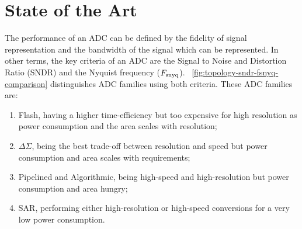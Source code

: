 
\chapter{State of the Art}
\label{sec:soa}
\ifpdf
    \graphicspath{{Chapter2/Figs/Raster/}{Chapter2/Figs/PDF/}{Chapter2/Figs/}}
\else
    \graphicspath{{Chapter2/Figs/Vector/}{Chapter2/Figs/}}
\fi
{}
The performance of an ADC can be defined by the fidelity of signal representation and the bandwidth of the signal which can be represented. In other terms, the key criteria of an ADC are the Signal to Noise and Distortion Ratio (SNDR) and the Nyquist frequency ($F_{\rm snyq}$). \figurename~\ref{fig:topology-sndr-fsnyq-comparison} distinguishes ADC families using both criteria. These ADC families are:
\begin{enumerate}
	\item Flash, having a higher time-efficiency but too expensive for high resolution as power consumption and the area scales with resolution;
	\item $\Delta\Sigma$, being the best trade-off between resolution and speed but power consumption and area scales with requirements;
	\item Pipelined and Algorithmic, being high-speed and high-resolution but power consumption and area hungry;
	\item SAR, performing either high-resolution or high-speed conversions for a very low power consumption.
\end{enumerate}

